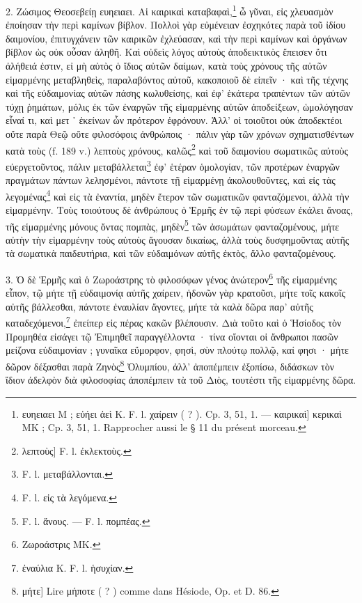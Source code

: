 \documentclass[landscape, a4paper, 11pt, oneside, polutonikogreek, french]{article}
\begin{document}
2. Ζώσιμος Θεοσεβείῃ ευηειαει. Αἱ καιρικαὶ καταβαφαὶ,\footnote{ευηειαει M ; εὐήει ἀεὶ K. F. l. χαίρειν ( ? ). Cp. 3, 51, 1. --- καιρικαὶ] κερικαὶ MK ; Cp. 3, 51, 1. Rapprocher aussi le § 11 du présent morceau.} ὦ γῦναι, εἰς χλευασμὸν ἐποίησαν τὴν περὶ καμίνων βίβλον. Πολλοὶ γὰρ εὐμένειαν ἐσχηκότες παρὰ τοῦ ἰδίου δαιμονίου, ἐπιτυγχάνειν τῶν καιρικῶν ἐχλεύασαν, καὶ τὴν περὶ καμίνων καὶ ὀργάνων βίβλον ὡς οὐκ οὖσαν ἀληθῆ. Καὶ οὐδεὶς λόγος αὐτοὺς ἀποδεικτικὸς ἔπεισεν ὅτι ἀλήθειά ἐστιν, εἰ μὴ αὐτὸς ὁ ἴδιος αὐτῶν δαίμων, κατὰ τοὺς χρόνους τῆς αὐτῶν εἱμαρμένης μεταβληθεὶς, παραλαβόντος αὐτοῦ, κακοποιοῦ δὲ εἰπεῖν · καὶ τῆς τέχνης καὶ τῆς εὐδαιμονίας αὐτῶν πάσης κωλυθείσης, καὶ ἐφ' ἑκάτερα τραπέντων τῶν αὐτῶν τύχῃ ῥημάτων, μόλις ἐκ τῶν ἐναργῶν τῆς εἱμαρμένης αὐτῶν ἀποδείξεων, ὡμολόγησαν εἶναί τι, καὶ μετ ῾ ἐκείνων ὧν πρότερον ἐφρόνουν. Ἀλλ' οἱ τοιοῦτοι οὐκ ἀποδεκτέοι οὔτε παρὰ Θεῷ οὔτε φιλοσόφοις ἀνθρώποις · πάλιν γὰρ τῶν χρόνων σχηματισθέντων κατὰ τοὺς (f. 189 v.) λεπτοὺς χρόνους, καλῶς\footnote{λεπτοὺς] F. l. ἐκλεκτοὺς.} καὶ τοῦ δαιμονίου σωματικῶς αὐτοὺς εὐεργετοῦντος, πάλιν μεταβάλλεται\footnote{F. l. μεταβάλλονται.} ἐφ' ἑτέραν ὁμολογίαν, τῶν προτέρων ἐναργῶν πραγμάτων πάντων λελησμένοι, πάντοτε τῇ εἱμαρμένῃ ἀκολουθοῦντες, καὶ εἰς τὰς λεγομένας\footnote{F. l. εἰς τὰ λεγόμενα.} καὶ εἰς τὰ ἐναντία, μηδὲν ἕτερον τῶν σωματικῶν φανταζόμενοι, ἀλλὰ τὴν εἱμαρμένην. Τοὺς τοιούτους δὲ ἀνθρώπους ὁ Ἑρμῆς ἐν τῷ περὶ φύσεων ἐκάλει ἄνοας, τῆς εἱμαρμένης μόνους ὄντας πομπὰς, μηδὲν\footnote{F. l. ἄνους. --- F. l. πομπέας.} τῶν ἀσωμάτων φανταζομένους, μήτε αὐτὴν τὴν εἱμαρμένην τοὺς αὐτοὺς ἄγουσαν δικαίως, ἀλλὰ τοὺς δυσφημοῦντας αὐτῆς τὰ σωματικὰ παιδευτήρια, καὶ τῶν εὐδαιμόνων αὐτῆς ἐκτὸς, ἄλλο φανταζομένους.

3. Ὁ δὲ Ἑρμῆς καὶ ὁ Ζωροάστρης τὸ φιλοσόφων γένος ἀνώτερον\footnote{Ζωροάστρις MK.} τῆς εἱμαρμένης εἶπον, τῷ μήτε τῇ εὐδαιμονίᾳ αὐτῆς χαίρειν, ἡδονῶν γὰρ κρατοῦσι, μήτε τοῖς κακοῖς αὐτῆς βάλλεσθαι, πάντοτε ἐναυλίαν ἄγοντες, μήτε τὰ καλὰ δῶρα παρ' αὐτῆς καταδεχόμενοι,\footnote{ἐναύλια K. F. l. ἡσυχίαν.} ἐπείπερ εἰς πέρας κακῶν βλέπουσιν. Διὰ τοῦτο καὶ ὁ Ἡσίοδος τὸν Προμηθέα εἰσάγει τῷ Ἐπιμηθεῖ παραγγέλλοντα · τίνα οἴονται οἱ ἄνθρωποι πασῶν μείζονα εὐδαιμονίαν ; γυναῖκα εὔμορφον, φησὶ, σὺν πλούτῳ πολλῷ, καί φησι · μήτε δῶρον δέξασθαι παρὰ Ζηνὸς\footnote{μήτε] Lire μήποτε ( ? ) comme dans Hésiode, Op. et D. 86.} Ὀλυμπίου, ἀλλ' ἀποπέμπειν ἐξοπίσω, διδάσκων τὸν ἴδιον ἀδελφὸν διὰ φιλοσοφίας ἀποπέμπειν τὰ τοῦ Διὸς, τουτέστι τῆς εἱμαρμένης δῶρα.
\end{document}
